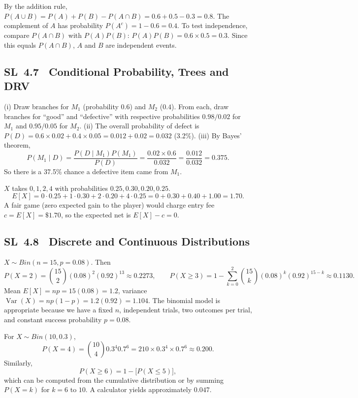 \documentclass[11pt]{article}
\def\mathrm#1{#1}%
\newcommand{\tocsubsection}[1]{\subsection{#1}}
\begin{document}
\begin{solution}
By the addition rule,
$P(A\cup B)=P(A)+P(B)-P(A\cap B)=0.6+0.5-0.3=0.8$.
The complement of $A$ has probability $P(A^c)=1-0.6=0.4$.
To test independence, compare $P(A\cap B)$ with $P(A)P(B)$:
$P(A)P(B)=0.6\times0.5=0.3$.  Since this equals $P(A\cap B)$, $A$ and
$B$ are independent events.
\end{solution}


\tocsubsection{SL 4.7 \; Conditional Probability, Trees and DRV}

\begin{solution}
(i) Draw branches for $M_1$ (probability $0.6$) and $M_2$ ($0.4$).  From
each, draw branches for ``good'' and ``defective'' with respective
probabilities $0.98/0.02$ for $M_1$ and $0.95/0.05$ for $M_2$.  (ii) The
overall probability of defect is
$P(D)=0.6\times0.02+0.4\times0.05=0.012+0.02=0.032$ (3.2\%).  (iii) By
Bayes’ theorem,
\[P(M_1\mid D)=\frac{P(D\mid M_1)P(M_1)}{P(D)}=
  \frac{0.02\times0.6}{0.032}=\frac{0.012}{0.032}=0.375.
\]
So there is a 37.5\% chance a defective item came from $M_1$.
\end{solution}

\begin{solution}
$X$ takes $0,1,2,4$ with probabilities $0.25,0.30,0.20,0.25$.
\[
E[X]=0\cdot0.25+1\cdot0.30+2\cdot0.20+4\cdot0.25=0+0.30+0.40+1.00=1.70.
\]
A fair game (zero expected gain to the player) would charge entry fee $c=E[X]=\$1.70$, so the expected net is $E[X]-c=0$.
\end{solution}





\tocsubsection{SL 4.8 \; Discrete and Continuous Distributions}

\begin{solution}
$X\sim\mathrm{Bin}(n=15,p=0.08)$. Then
\[
P(X=2)=\binom{15}{2}(0.08)^2(0.92)^{13}\approx 0.2273,\qquad
P(X\ge 3)=1-\sum_{k=0}^{2}\binom{15}{k}(0.08)^k(0.92)^{15-k}\approx 0.1130.
\]
Mean $E[X]=np=15(0.08)=1.2$, variance $\operatorname{Var}(X)=np(1-p)=1.2(0.92)=1.104$. The binomial model is appropriate because we have a fixed $n$, independent trials, two outcomes per trial, and constant success probability $p=0.08$.
\end{solution}






\begin{solution}
For $X\sim\mathrm{Bin}(10,0.3)$,
\[P(X=4)=\binom{10}{4}0.3^4 0.7^6=210\times0.3^4\times0.7^6\approx0.200.
\]
Similarly,
\[P(X\ge6)=1-\bigl[P(X\le5)\bigr],
\]
which can be computed from the cumulative distribution or by summing
$P(X=k)$ for $k=6$ to $10$.  A calculator yields approximately $0.047$.
\end{solution}
\end{document}
